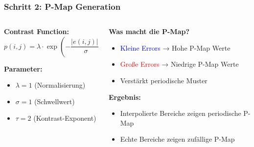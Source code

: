 \documentclass[11pt,t,usepdftitle=false,aspectratio=169]{beamer}
\begin{document}
\begin{frame}
	\frametitle{Schritt 2: P-Map Generation}
	
	\begin{columns}[T]
		\begin{column}{0.45\textwidth}
			\textbf{Contrast Function:}
			$$p(i,j) = \lambda \cdot \exp\left(-\frac{|e(i,j)|^\tau}{\sigma}\right)$$
			
			\vspace{0.5em}
			\textbf{Parameter:}
			\begin{itemize}
				\item $\lambda = 1$ (Normalisierung)
				\item $\sigma = 1$ (Schwellwert)
				\item $\tau = 2$ (Kontrast-Exponent)
			\end{itemize}
		\end{column}
		\begin{column}{0.5\textwidth}
			\textbf{Was macht die P-Map?}
			\begin{itemize}
				\item \textcolor{blue}{Kleine Errors} → Hohe P-Map Werte
				\item \textcolor{red}{Große Errors} → Niedrige P-Map Werte
				\item Verstärkt periodische Muster
			\end{itemize}
			
			\vspace{0.5em}
			\textbf{Ergebnis:}
			\begin{itemize}
				\item Interpolierte Bereiche zeigen periodische P-Map
				\item Echte Bereiche zeigen zufällige P-Map
			\end{itemize}
		\end{column}
	\end{columns}
\end{frame}
\end{document}
